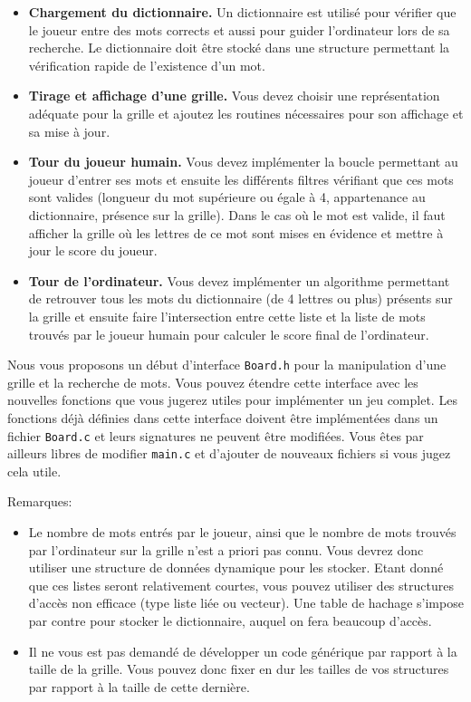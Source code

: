 \documentclass[a4paper,10pt]{article}
\begin{document}
\begin{itemize}
\item \textbf{Chargement du dictionnaire.} Un dictionnaire est utilisé pour
  vérifier que le joueur entre des mots corrects et aussi pour
  guider l'ordinateur lors de sa recherche. Le dictionnaire doit être
  stocké dans une structure permettant la vérification rapide de
  l'existence d'un mot.
\item \textbf{Tirage et affichage d'une grille.} Vous devez choisir une
  représentation adéquate pour la grille et ajoutez les routines nécessaires
  pour son affichage et sa mise à jour.
\item \textbf{Tour du joueur humain.} Vous devez implémenter la boucle
  permettant au joueur d'entrer ses mots et ensuite les
  différents filtres vérifiant que ces mots sont valides (longueur du
  mot supérieure ou égale à 4, appartenance au dictionnaire, présence
  sur la grille). Dans le cas où le mot est valide, il faut afficher
  la grille où les lettres de ce mot sont mises en évidence et mettre
  à jour le score du joueur.
\item \textbf{Tour de l'ordinateur.} Vous devez implémenter un algorithme
  permettant de retrouver tous les mots du dictionnaire (de 4 lettres
  ou plus) présents sur la grille et ensuite faire l'intersection
  entre cette liste et la liste de mots trouvés par le joueur humain
  pour calculer le score final de l'ordinateur.
\end{itemize}

Nous vous proposons un début d'interface \texttt{Board.h} pour la manipulation
d'une grille et la recherche de mots.  Vous pouvez étendre cette interface avec
les nouvelles fonctions que vous jugerez utiles pour implémenter un jeu complet.
Les fonctions déjà définies dans cette interface doivent être implémentées dans
un fichier \texttt{Board.c} et leurs signatures ne peuvent être modifiées. Vous
êtes par ailleurs libres de modifier \texttt{main.c} et d'ajouter de nouveaux
fichiers si vous jugez cela utile.

Remarques:
\begin{itemize}
\item Le nombre de mots entrés par le joueur, ainsi que le nombre
  de mots trouvés par l'ordinateur sur la grille n'est a priori pas
  connu. Vous devrez donc utiliser une structure de données dynamique
  pour les stocker. Etant donné que ces listes seront relativement
  courtes, vous pouvez utiliser des structures d'accès non efficace
  (type liste liée ou vecteur). Une table de hachage s'impose par
  contre pour stocker le dictionnaire, auquel on fera beaucoup
  d'accès.
\item Il ne vous est pas demandé de développer un code générique par
  rapport à la taille de la grille. Vous pouvez donc fixer en dur les
  tailles de vos structures par rapport à la taille de cette dernière.
\end{itemize}
\end{document}
